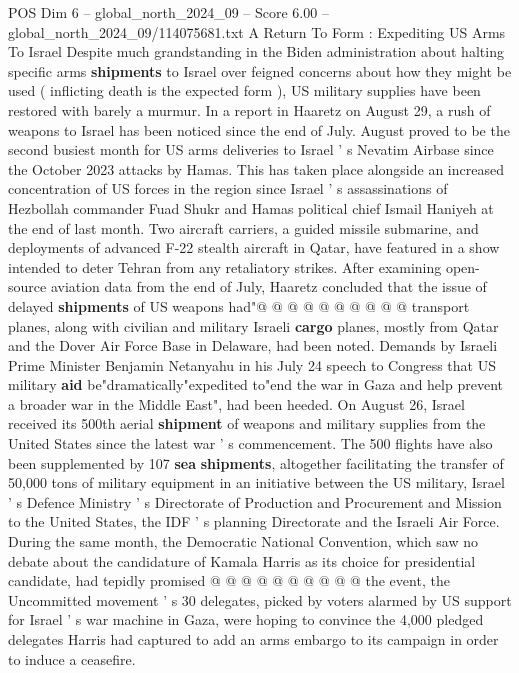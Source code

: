 \begin{textsample}{POS Dim 6 – global\_north\_2024\_09 – Score 6.00 – global\_north\_2024\_09/114075681.txt}  \label{ex:f6_pos_424}
A Return To Form : Expediting US Arms To Israel Despite much grandstanding in the Biden administration about halting specific arms \textbf{shipments} to Israel over feigned concerns about how they might be used ( inflicting death is the expected form ), US military supplies have been restored with barely a murmur.
In a report in Haaretz on August 29, a rush of weapons to Israel has been noticed since the end of July.
August proved to be the second busiest month for US arms deliveries to Israel ' s Nevatim Airbase since the October 2023 attacks by Hamas.
This has taken place alongside an increased concentration of US forces in the region since Israel ' s assassinations of Hezbollah commander Fuad Shukr and Hamas political chief Ismail Haniyeh at the end of last month.
Two aircraft carriers, a guided missile submarine, and deployments of advanced F-22 stealth aircraft in Qatar, have featured in a show intended to deter Tehran from any retaliatory strikes.
After examining open-source aviation data from the end of July, Haaretz concluded that the issue of delayed \textbf{shipments} of US weapons had"@ @ @ @ @ @ @ @ @ @ transport planes, along with civilian and military Israeli \textbf{cargo} planes, mostly from Qatar and the Dover Air Force Base in Delaware, had been noted.
Demands by Israeli Prime Minister Benjamin Netanyahu in his July 24 speech to Congress that US military \textbf{aid} be"dramatically"expedited to"end the war in Gaza and help prevent a broader war in the Middle East", had been heeded.
On August 26, Israel received its 500th aerial \textbf{shipment} of weapons and military supplies from the United States since the latest war ' s commencement.
The 500 flights have also been supplemented by 107 \textbf{sea} \textbf{shipments}, altogether facilitating the transfer of 50,000 tons of military equipment in an initiative between the US military, Israel ' s Defence Ministry ' s Directorate of Production and Procurement and Mission to the United States, the IDF ' s planning Directorate and the Israeli Air Force.
During the same month, the Democratic National Convention, which saw no debate about the candidature of Kamala Harris as its choice for presidential candidate, had tepidly promised @ @ @ @ @ @ @ @ @ @ the event, the Uncommitted movement ' s 30 delegates, picked by voters alarmed by US support for Israel ' s war machine in Gaza, were hoping to convince the 4,000 pledged delegates Harris had captured to add an arms embargo to its campaign in order to induce a ceasefire.

\end{textsample}
